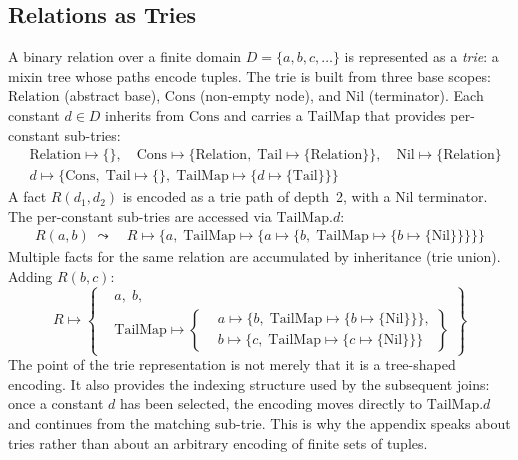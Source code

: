 \subsection{Relations as Tries}

A binary relation over a finite domain $D = \{a, b, c, \ldots\}$
is represented as a \emph{trie}: a mixin tree whose paths
encode tuples.
The trie is built from three base scopes:
$\mathrm{Relation}$ (abstract base),
$\mathrm{Cons}$ (non-empty node), and $\mathrm{Nil}$ (terminator).
Each constant $d \in D$ inherits from $\mathrm{Cons}$ and carries
a $\mathrm{TailMap}$ that provides per-constant sub-tries:
\begin{align*}
  &\mathrm{Relation} \mapsto \{\},\quad
  \mathrm{Cons} \mapsto \{\mathrm{Relation},\;
  \mathrm{Tail} \mapsto \{\mathrm{Relation}\}\},\quad
  \mathrm{Nil} \mapsto \{\mathrm{Relation}\}\\[2pt]
  &d \mapsto \{\mathrm{Cons},\;
    \mathrm{Tail} \mapsto \{\},\;
  \mathrm{TailMap} \mapsto \{d \mapsto \{\mathrm{Tail}\}\}\}
\end{align*}
A fact $R(d_1, d_2)$ is encoded as a trie path of depth~2,
with a $\mathrm{Nil}$ terminator.
The per-constant sub-tries are accessed via
$\mathrm{TailMap}.d$:
\begin{align*}
  R(a, b) \;\leadsto\quad
  R \mapsto \{a,\; \mathrm{TailMap} \mapsto \{a \mapsto
  \{b,\; \mathrm{TailMap} \mapsto \{b \mapsto \{\mathrm{Nil}\}\}\}\}\}
\end{align*}
Multiple facts for the same relation are accumulated by
inheritance (trie union).
Adding $R(b, c)$:
\[
  R \mapsto \left\{
    \begin{aligned}
      &a,\; b,\\
      &\mathrm{TailMap} \mapsto \left\{
        \begin{aligned}
          &a \mapsto \{b,\; \mathrm{TailMap} \mapsto \{b \mapsto \{\mathrm{Nil}\}\}\},\\
          &b \mapsto \{c,\; \mathrm{TailMap} \mapsto \{c \mapsto \{\mathrm{Nil}\}\}\}
      \end{aligned}\right\}
  \end{aligned}\right\}
\]
The point of the trie representation is not merely that it is a
tree-shaped encoding.
It also provides the indexing structure used by the subsequent
joins: once a constant $d$ has been selected, the encoding moves
directly to $\mathrm{TailMap}.d$ and continues from the matching
sub-trie.
This is why the appendix speaks about tries rather than about an
arbitrary encoding of finite sets of tuples.

